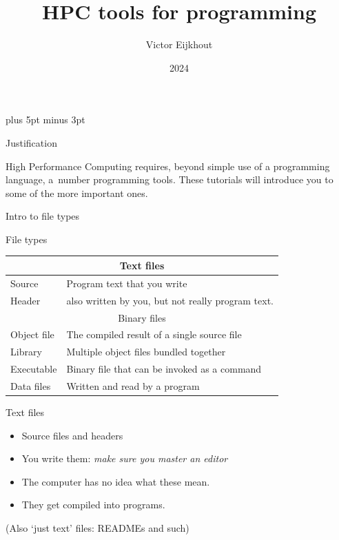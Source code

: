 \documentclass[11pt,headernav]{beamer}
\begin{document}
\parskip=10pt plus 5pt minus 3pt

\title{HPC tools for programming}
\author{Victor Eijkhout}
\date{2024}

\begin{frame}{}
  \titlepage
\end{frame}


\begin{numberedframe}{Justification}

  High Performance Computing requires,
  beyond simple use of a programming language,
  a~number programming tools. These tutorials
  will introduce you to some of the more important ones.

\end{numberedframe}

 {Intro to file types}

\begin{numberedframe}{File types}
  \label{sl-tut:file-type}
  \begin{tabular}{ll}
    \toprule
    \multicolumn{2}{c}{Text files}\\
    \midrule
    Source&Program text that you write\\
    Header&also written by you, but not really program text.\\
    \midrule
    \multicolumn{2}{c}{Binary files}\\
    \midrule
    Object file&The compiled result of a single source file\\
    Library&Multiple object files bundled together\\
    Executable&Binary file that can be invoked as a command\\
    Data files&Written and read by a program\\
    \bottomrule
  \end{tabular}
\end{numberedframe}

\begin{numberedframe}{Text files}
  \label{sl-tut:text-file}
  \begin{itemize}
  \item Source files and headers
  \item You write them: \emph{make sure you master an editor}
  \item The computer has no idea what these mean.
  \item They get compiled into programs.
  \end{itemize}
  (Also `just text' files: READMEs and such)
\end{numberedframe}
\end{document}
